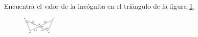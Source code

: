 Encuentra el valor de la incógnita en el triángulo de la figura \ref{fig:angle_triangle_29}.

\begin{minipage}[t]{0.35\textwidth
    }\begin{figure}[H]
        \centering
        \includegraphics[width=0.15\textwidth]{../images/angle_triangle_29.png}

        \caption{}
        \label{fig:angle_triangle_29}
    \end{figure}
\end{minipage}\hfill
\begin{minipage}[t]{0.65\textwidth}
    \begin{solutionbox}{5cm}

    \end{solutionbox}
\end{minipage}

